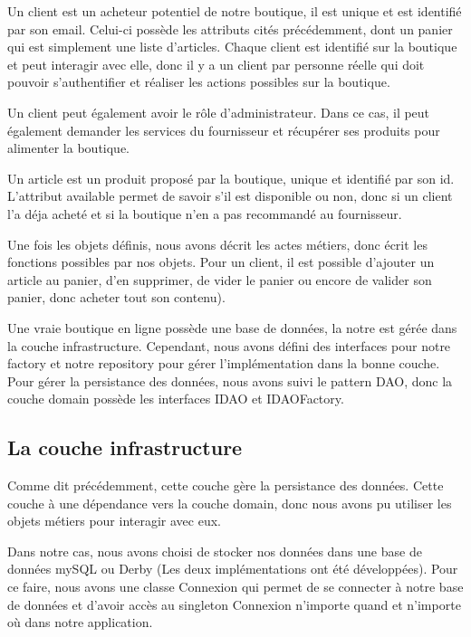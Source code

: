 \documentclass[a4paper]{article}
\begin{document}
    \bigskip
    
    Un client est un acheteur potentiel de notre boutique, il est unique et est identifié par son email. Celui-ci possède les attributs cités précédemment, dont un panier qui est simplement une liste d'articles. Chaque client est identifié sur la boutique et peut interagir avec elle, donc il y a un client par personne réelle qui doit pouvoir s'authentifier et réaliser les actions possibles sur la boutique.
    
    \bigskip
    
    Un client peut également avoir le rôle d'administrateur. Dans ce cas, il peut également demander les services du fournisseur et récupérer ses produits pour alimenter la boutique.
    
    \bigskip
    
    Un article est un produit proposé par la boutique, unique et identifié par son id. L'attribut available permet de savoir s'il est disponible ou non, donc si un client l'a déja acheté et si la boutique n'en a pas recommandé au fournisseur.

    \bigskip
    
    Une fois les objets définis, nous avons décrit les actes métiers, donc écrit les fonctions possibles par nos objets. Pour un client, il est possible d'ajouter un article au panier, d'en supprimer, de vider le panier ou encore de valider son panier, donc acheter tout son contenu).
    
    
    \bigskip
    
    Une vraie boutique en ligne possède une base de données, la notre est gérée dans la couche infrastructure. Cependant, nous avons défini des interfaces pour notre factory et notre repository pour gérer l'implémentation dans la bonne couche. Pour gérer la persistance des données, nous avons suivi le pattern DAO, donc la couche domain possède les interfaces IDAO et IDAOFactory.
    
    
\subsection{La couche infrastructure}
    Comme dit précédemment, cette couche gère la persistance des données. Cette couche à une dépendance vers la couche domain, donc nous avons pu utiliser les objets métiers pour interagir avec eux. 
    
    \bigskip
    
    Dans notre cas, nous avons choisi de stocker nos données dans une base de données mySQL ou Derby (Les deux implémentations ont été développées). Pour ce faire, nous avons une classe Connexion qui permet de se connecter à notre base de données et d'avoir accès au singleton Connexion n'importe quand et n'importe où dans notre application.
    
\end{document}
